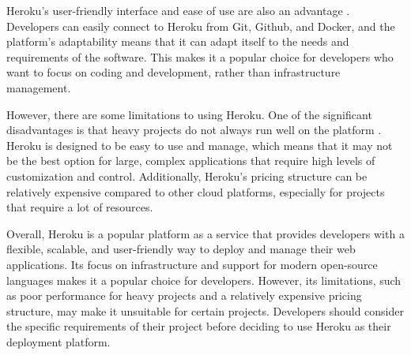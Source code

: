 Heroku's user-friendly interface and ease of use are also an advantage \cite{greengard}. Developers can easily connect to Heroku from Git, Github, and Docker, and the platform's adaptability means that it can adapt itself to the needs and requirements of the software. This makes it a popular choice for developers who want to focus on coding and development, rather than infrastructure management.

However, there are some limitations to using Heroku. One of the significant disadvantages is that heavy projects do not always run well on the platform \cite{greengard}. Heroku is designed to be easy to use and manage, which means that it may not be the best option for large, complex applications that require high levels of customization and control. Additionally, Heroku's pricing structure can be relatively expensive compared to other cloud platforms, especially for projects that require a lot of resources.

Overall, Heroku is a popular platform as a service that provides developers with a flexible, scalable, and user-friendly way to deploy and manage their web applications. Its focus on infrastructure and support for modern open-source languages makes it a popular choice for developers. However, its limitations, such as poor performance for heavy projects and a relatively expensive pricing structure, may make it unsuitable for certain projects. Developers should consider the specific requirements of their project before deciding to use Heroku as their deployment platform.